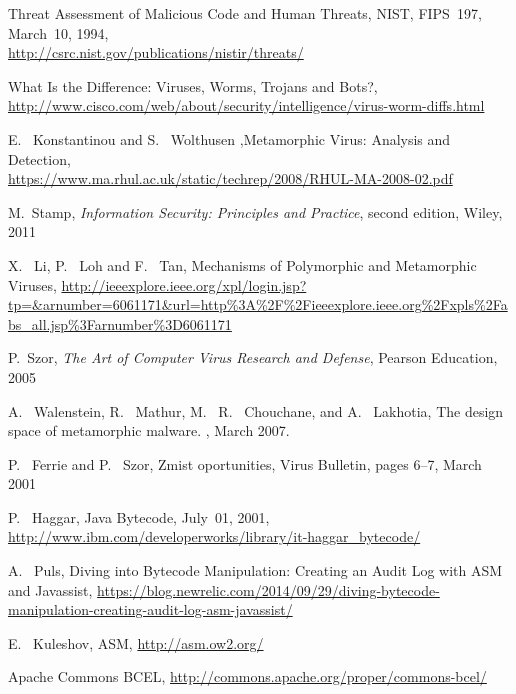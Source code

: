 %
%
%
%
\begin{thebibliography}{10}

 Threat Assessment of Malicious Code and Human Threats, NIST, 
FIPS~197, March~10, 1994,\\
\url{http://csrc.nist.gov/publications/nistir/threats/}

 What Is the Difference: Viruses, Worms, Trojans and Bots?,\\
\url{http://www.cisco.com/web/about/security/intelligence/virus-worm-diffs.html}

 E. ~Konstantinou and S. ~Wolthusen ,Metamorphic Virus: Analysis and Detection,\\
\url{https://www.ma.rhul.ac.uk/static/techrep/2008/RHUL-MA-2008-02.pdf}

 M.~Stamp, {\it Information Security: Principles and Practice}, second edition, 
Wiley, 2011

 X. ~Li, P. ~Loh and F. ~Tan, Mechanisms of Polymorphic and Metamorphic Viruses,
\url{http://ieeexplore.ieee.org/xpl/login.jsp?tp=&arnumber=6061171&url=http%3A%2F%2Fieeexplore.ieee.org%2Fxpls%2Fabs_all.jsp%3Farnumber%3D6061171}

 P.~Szor, {\it The Art of Computer Virus Research and Defense}, Pearson Education, 2005

A. ~Walenstein, R. ~Mathur, M. ~R. ~Chouchane, and A. ~Lakhotia, The design space of metamorphic malware. , March 2007. 

 P. ~Ferrie and P. ~Szor, Zmist oportunities, Virus Bulletin, pages 6–7, March 2001

 P. ~Haggar, Java Bytecode, July~01, 2001,\\
\url{http://www.ibm.com/developerworks/library/it-haggar_bytecode/}

 A. ~Puls, Diving into Bytecode Manipulation: Creating an Audit Log with ASM and Javassist,
\url{https://blog.newrelic.com/2014/09/29/diving-bytecode-manipulation-creating-audit-log-asm-javassist/}

 E. ~Kuleshov, ASM,
\url{http://asm.ow2.org/}

 Apache Commons BCEL,
\url{http://commons.apache.org/proper/commons-bcel/}


\end{thebibliography}
